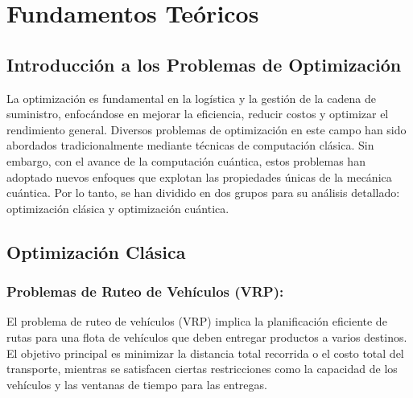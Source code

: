 \documentclass[11pt,a4paper,spanish]{book}
\begin{document}
\chapter{Fundamentos Teóricos}

\section{Introducción a los Problemas de Optimización}

La optimización es fundamental en la logística y la gestión de la cadena de suministro, enfocándose en mejorar la eficiencia, reducir costos y optimizar el rendimiento general. Diversos problemas de optimización en este campo han sido abordados tradicionalmente mediante técnicas de computación clásica. Sin embargo, con el avance de la computación cuántica, estos problemas han adoptado nuevos enfoques que explotan las propiedades únicas de la mecánica cuántica. Por lo tanto, se han dividido en dos grupos para su análisis detallado: optimización clásica y optimización cuántica.

\section{Optimización Clásica}

\subsection{Problemas de Ruteo de Vehículos (VRP):} 
	
	El problema de ruteo de vehículos (VRP) implica la planificación eficiente de rutas para una flota de vehículos que deben entregar productos a varios destinos. El objetivo principal es minimizar la distancia total recorrida o el costo total del transporte, mientras se satisfacen ciertas restricciones como la capacidad de los vehículos y las ventanas de tiempo para las entregas.
	
\end{document}
